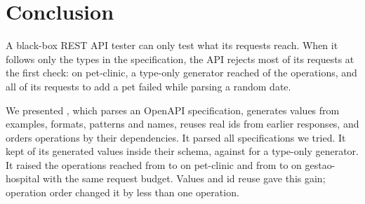 \section{Conclusion}
\label{sec:conclusion}

A black-box REST API tester can only test what its requests reach. When it
follows only the types in the specification, the API rejects most of its
requests at the first check: on pet-clinic, a type-only generator reached
\NPetclinicBaselineCov of the operations, and all \NMotivBaselineRequests of
its requests to add a pet failed while parsing a random date.

We presented \tool, which parses an OpenAPI specification, generates values
from examples, formats, patterns and names, reuses real ids from earlier
responses, and orders operations by their dependencies. It parsed all
\NSpecs specifications we tried. It kept \NConfTool of its generated values
inside their schema, against \NConfBaseline for a type-only generator. It
raised the operations reached from \NPetclinicBaselineCov to
\NPetclinicFullCov on pet-clinic and from \NGestaohospitalBaselineCov to
\NGestaohospitalFullCov on gestao-hospital with the same request budget.
Values and id reuse gave this gain; operation order changed it by less than
one operation.
